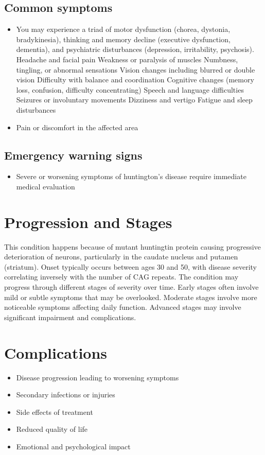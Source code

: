 \subsection{Common symptoms}
\begin{itemize}[noitemsep]
  \item You may experience a triad of motor dysfunction (chorea, dystonia, bradykinesia), thinking and memory decline (executive dysfunction, dementia), and psychiatric disturbances (depression, irritability, psychosis). Headache and facial pain Weakness or paralysis of muscles Numbness, tingling, or abnormal sensations Vision changes including blurred or double vision Difficulty with balance and coordination Cognitive changes (memory loss, confusion, difficulty concentrating) Speech and language difficulties Seizures or involuntary movements Dizziness and vertigo Fatigue and sleep disturbances
  \item Pain or discomfort in the affected area
  \end{itemize}
\subsection{Emergency warning signs}
\begin{itemize}[noitemsep]
  \item Severe or worsening symptoms of huntington's disease require immediate medical evaluation
\end{itemize}
\section{Progression and Stages}
This condition happens because of mutant huntingtin protein causing progressive deterioration of neurons, particularly in the caudate nucleus and putamen (striatum). Onset typically occurs between ages 30 and 50, with disease severity correlating inversely with the number of CAG repeats. The condition may progress through different stages of severity over time. Early stages often involve mild or subtle symptoms that may be overlooked. Moderate stages involve more noticeable symptoms affecting daily function. Advanced stages may involve significant impairment and complications.
\section{Complications}
\begin{itemize}[noitemsep]
  \item Disease progression leading to worsening symptoms
  \item Secondary infections or injuries
  \item Side effects of treatment
  \item Reduced quality of life
  \item Emotional and psychological impact
\end{itemize}
